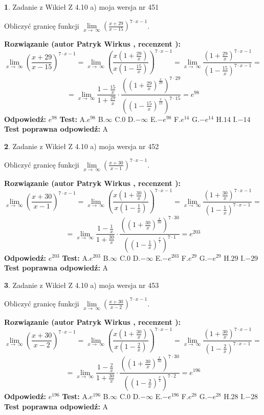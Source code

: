 \documentclass[12pt, a4paper]{article}
\theoremstyle{definition} %
\newtheorem{zad}{}
\newcommand{\zadStart}[1]{\begin{zad}#1\newline}
\newcommand{\zadStop}{\end{zad}}
\newcommand{\rozwStart}[2]{\noindent \textbf{Rozwiązanie (autor #1 , recenzent #2): }\newline}
\newcommand{\rozwStop}{\newline}
\newcommand{\odpStart}{\noindent \textbf{Odpowiedź:}\newline}
\newcommand{\odpStop}{\newline}
\newcommand{\testStart}{\noindent \textbf{Test:}\newline}
\newcommand{\testStop}{\newline}
\newcommand{\kluczStart}{\noindent \textbf{Test poprawna odpowiedź:}\newline}
\newcommand{\kluczStop}{\newline}
\begin{document}
\zadStart{Zadanie z Wikieł Z 4.10 a) moja wersja nr 451}

Obliczyć granicę funkcji  $\lim\limits_{x\to\ \infty}(\frac{x+29}{x-15})^{7\cdot x-1}$.
\zadStop
\rozwStart{Patryk Wirkus}{}
$$\lim\limits_{x\to\ \infty}(\frac{x+29}{x-15})^{7\cdot x-1} = \lim\limits_{x\to\ \infty}(\frac{x(1+\frac{29}{x})}{x(1-\frac{15}{x})})^{7\cdot x-1}=\lim\limits_{x\to\ \infty}\frac{(1+\frac{29}{x})^{7\cdot x-1}}{(1-\frac{15}{x})^{7\cdot x-1}}=$$
$$=\lim\limits_{x\to\ \infty}\frac{1-\frac{15}{x}}{1+\frac{29}{x}}\cdot\frac{((1+\frac{29}{x})^{\frac{x}{29}})^{7\cdot29}}{((1-\frac{15}{x})^{\frac{x}{15}})^{7\cdot15}}=e^{98}$$
\rozwStop
\odpStart
$e^{98}$
\odpStop
\testStart
A.$e^{98}$ B.$\infty$ C.$0$ D.$-\infty$ E.$-e^{98}$
F.$e^{14}$ G.$-e^{14}$
H.$14$
I.$-14$
\testStop
\kluczStart
A
\kluczStop



\zadStart{Zadanie z Wikieł Z 4.10 a) moja wersja nr 452}

Obliczyć granicę funkcji  $\lim\limits_{x\to\ \infty}(\frac{x+30}{x-1})^{7\cdot x-1}$.
\zadStop
\rozwStart{Patryk Wirkus}{}
$$\lim\limits_{x\to\ \infty}(\frac{x+30}{x-1})^{7\cdot x-1} = \lim\limits_{x\to\ \infty}(\frac{x(1+\frac{30}{x})}{x(1-\frac{1}{x})})^{7\cdot x-1}=\lim\limits_{x\to\ \infty}\frac{(1+\frac{30}{x})^{7\cdot x-1}}{(1-\frac{1}{x})^{7\cdot x-1}}=$$
$$=\lim\limits_{x\to\ \infty}\frac{1-\frac{1}{x}}{1+\frac{30}{x}}\cdot\frac{((1+\frac{30}{x})^{\frac{x}{30}})^{7\cdot30}}{((1-\frac{1}{x})^{\frac{x}{1}})^{7\cdot1}}=e^{203}$$
\rozwStop
\odpStart
$e^{203}$
\odpStop
\testStart
A.$e^{203}$ B.$\infty$ C.$0$ D.$-\infty$ E.$-e^{203}$
F.$e^{29}$ G.$-e^{29}$
H.$29$
I.$-29$
\testStop
\kluczStart
A
\kluczStop



\zadStart{Zadanie z Wikieł Z 4.10 a) moja wersja nr 453}

Obliczyć granicę funkcji  $\lim\limits_{x\to\ \infty}(\frac{x+30}{x-2})^{7\cdot x-1}$.
\zadStop
\rozwStart{Patryk Wirkus}{}
$$\lim\limits_{x\to\ \infty}(\frac{x+30}{x-2})^{7\cdot x-1} = \lim\limits_{x\to\ \infty}(\frac{x(1+\frac{30}{x})}{x(1-\frac{2}{x})})^{7\cdot x-1}=\lim\limits_{x\to\ \infty}\frac{(1+\frac{30}{x})^{7\cdot x-1}}{(1-\frac{2}{x})^{7\cdot x-1}}=$$
$$=\lim\limits_{x\to\ \infty}\frac{1-\frac{2}{x}}{1+\frac{30}{x}}\cdot\frac{((1+\frac{30}{x})^{\frac{x}{30}})^{7\cdot30}}{((1-\frac{2}{x})^{\frac{x}{2}})^{7\cdot2}}=e^{196}$$
\rozwStop
\odpStart
$e^{196}$
\odpStop
\testStart
A.$e^{196}$ B.$\infty$ C.$0$ D.$-\infty$ E.$-e^{196}$
F.$e^{28}$ G.$-e^{28}$
H.$28$
I.$-28$
\testStop
\kluczStart
A
\kluczStop
\end{document}
